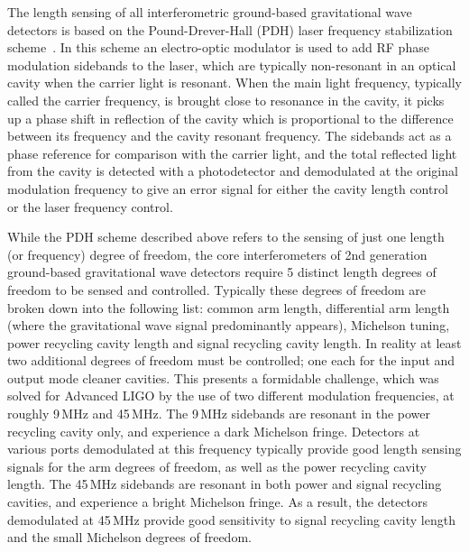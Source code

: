 The length sensing of all interferometric ground-based gravitational wave detectors is based on the Pound-Drever-Hall (PDH) laser 
frequency stabilization scheme~\cite{PDH}. 
In this scheme an electro-optic modulator is used to add RF phase modulation sidebands to the laser, 
which are typically non-resonant in an optical cavity when the carrier light is resonant.
When the main light frequency, typically called the carrier frequency, is brought close to resonance in the cavity, 
it picks up a phase shift in reflection of the cavity which is proportional to the difference between its 
frequency and the cavity resonant frequency. The sidebands act as a phase reference for comparison with the 
carrier light, and the total reflected light 
from the cavity is detected with a photodetector and demodulated at the original modulation frequency to give an error 
signal for either the cavity length control or the laser frequency control. 

While the PDH scheme described above refers to the sensing of just one length (or frequency) degree of freedom, 
the core interferometers of 2nd generation ground-based gravitational wave detectors require 5 distinct length degrees of freedom to 
be sensed and controlled. Typically these degrees of freedom are broken down into the following list: common arm length, 
differential arm length (where the gravitational wave signal predominantly appears), Michelson tuning, power recycling cavity length and 
signal recycling cavity length. In reality at least two additional degrees of freedom must be controlled; one each for the input 
and output mode cleaner cavities. This presents a formidable challenge, which was solved for Advanced LIGO by the use of two 
different modulation frequencies, at roughly 9\,MHz and 45\,MHz. The 9\,MHz sidebands are resonant in the power recycling 
cavity only, and experience a dark Michelson fringe. Detectors at various ports demodulated at this frequency typically provide 
good length sensing signals for the arm degrees of freedom, as well as the power recycling cavity length. The 45\,MHz sidebands 
are resonant in both power and signal recycling cavities, and experience a bright Michelson fringe. As a result, the detectors demodulated 
at 45\,MHz provide good sensitivity to signal recycling cavity length and the small Michelson degrees of freedom.

